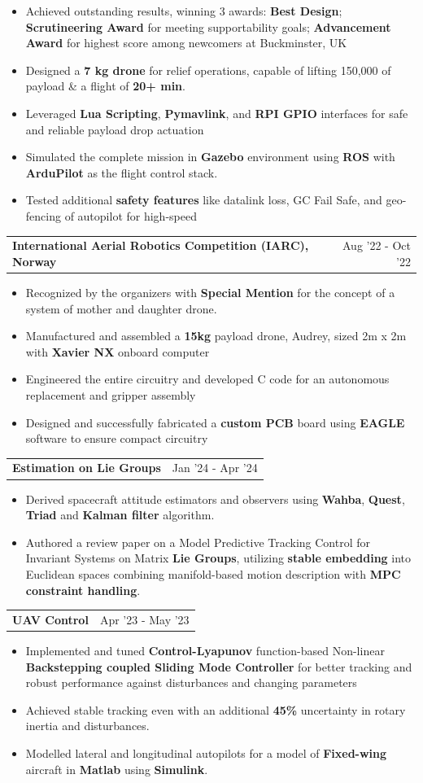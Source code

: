 \documentclass[letterpaper,11pt]{article}
\makeatletter
\newcommand{\resumeItem}[1]{
  \item\small{
    {#1 \vspace{-2pt}}
  }
}
\newcommand{\resumeProjectHeading}[2]{
    \vspace{-2pt}\item
    \begin{tabular*}{0.97\textwidth}{l@{\extracolsep{\fill}}r}
      \small#1 & #2 \\
    \end{tabular*}\vspace{-7pt}
}
\newcommand{\resumeItemListStart}{\begin{itemize}}
\newcommand{\resumeItemListEnd}{\end{itemize}\vspace{-5pt}}
\makeatother
\begin{document}
          \resumeItemListStart
            \resumeItem{Achieved outstanding results, winning 3 awards: \textbf{Best Design}; \textbf{Scrutineering Award} for meeting supportability goals; \textbf{Advancement Award} for highest score among newcomers at Buckminster, UK}
            \resumeItem{Designed a \textbf{7 kg drone} for relief operations, capable of lifting 150,000 of payload \& a flight of \textbf{20+ min}.}
            \resumeItem{Leveraged \textbf{Lua Scripting}, \textbf{Pymavlink}, and \textbf{RPI GPIO} interfaces for safe and reliable payload drop actuation}  
            \resumeItem{Simulated the complete mission in \textbf{Gazebo} environment using \textbf{ROS} with \textbf{ArduPilot} as the flight control stack.}
            \resumeItem{Tested additional \textbf{safety features} like datalink loss, GC Fail Safe, and geo-fencing of autopilot for high-speed}
          \resumeItemListEnd      
      \resumeProjectHeading
        {\textbf{International Aerial Robotics Competition (IARC), Norway \href{https://www.youtube.com/watch?v=VfRIcAEMAtk}{\textcolor{blue}\faYoutubePlay}}}{Aug ’22 - Oct ’22}
          \resumeItemListStart
            \resumeItem{Recognized by the organizers with \textbf{Special Mention} for the concept of a system of mother and daughter drone. }
 \resumeItem{Manufactured and assembled a \textbf{15kg} payload drone, Audrey, sized 2m x 2m with\textbf{ Xavier NX} onboard computer}
\resumeItem{Engineered the entire circuitry and developed C code for an autonomous replacement and gripper assembly}
\resumeItem{ Designed and successfully fabricated a \textbf{custom PCB} board using \textbf{EAGLE} software to ensure compact circuitry}
          \resumeItemListEnd
      
      \resumeProjectHeading
        {\textbf{Estimation on Lie Groups \href{https://github.com/prachitgupta/estimation-of-lie-groups.git}{\textcolor{blue}\faGithub}}}{Jan ’24 - Apr ’24}
          \resumeItemListStart
            \resumeItem{Derived spacecraft attitude estimators and observers using \textbf{Wahba}, \textbf{Quest}, \textbf{Triad} and \textbf{Kalman filter} algorithm.}         \resumeItem{Authored a review paper on a Model Predictive Tracking Control for Invariant Systems on Matrix \textbf{Lie Groups}, utilizing \textbf{stable embedding} into Euclidean spaces combining manifold-based motion description with \textbf{MPC constraint handling}.}
          \resumeItemListEnd
      
     \resumeProjectHeading
        {\textbf{UAV Control \href{https://drive.google.com/file/d/1YJMkE_d_qF7e8o8JVXV1JxMFuqVRfb9Q/view?usp=sharing}{\textcolor{blue}\faFileText}}}
        {Apr ’23 - May ’23}
          \resumeItemListStart
            \resumeItem{Implemented and tuned \textbf{Control-Lyapunov} function-based Non-linear \textbf{Backstepping coupled Sliding Mode Controller} for better tracking and robust performance against disturbances and changing parameters}
            \resumeItem{Achieved stable tracking even with an additional\textbf{ 45\%} uncertainty in rotary inertia and disturbances.}
            \resumeItem{Modelled lateral and longitudinal autopilots for a model of\textbf{ Fixed-wing} aircraft in \textbf{Matlab} using \textbf{Simulink}.}
          \resumeItemListEnd
      
\end{document}

